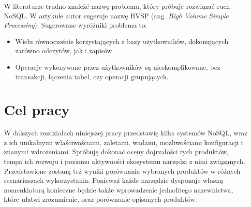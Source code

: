 W literaturze trudno znaleźć nazwę problemu, który próbuje rozwiązać ruch NoSQL. 
W artykule \cite{monash-db-hvsp} autor sugeruje nazwę HVSP (ang. \emph{High Volume Simple Processing}). 
Sugerowane wyróżniki problemu to:
\begin{itemize}
 \item Wielu równocześnie korzystających z bazy użytkowników, dokonujących zarówno odczytów, jak i zapisów.
 \item Operacje wykonywane przez użytkowników są nieskomplikowane, bez transakcji, łączenia tabel, czy operacji grupujących.
\end{itemize}

\section{Cel pracy}

W dalszych rozdziałach niniejszej pracy przedstawię kilka systemów NoSQL, wraz z ich unikalnymi właściwościami, zaletami, wadami, możliwościami konfiguracji i znanymi wdrożeniami.
Spróbuję dokonać oceny dojrzałości tych produktów, tempa ich rozwoju i poziomu aktywności ekosystemu narzędzi z nimi związanych.
Przedstawione zostaną też wyniki porównania wybranych produktów w różnych scenariuszach wykorzystania.
Ponieważ każde narzędzie dysponuje własną nomenklaturą konieczne będzie także wprowadzenie jednolitego nazewnictwa, które ułatwi zrozumienie, oraz porównanie opisanych produktów.
